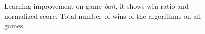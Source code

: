\begin{figure}
	\centering
	\caption{Learning improvement on game \textit{bait}, it shows win ratio and
		normalized score. Total number of wins of the algorithms on
	all games.}
\end{figure}

